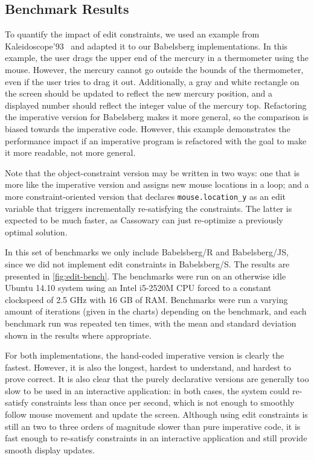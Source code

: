 \documentclass[numbers]{sigplanconf}
\begin{document}
\subsection*{Benchmark Results}
To quantify the impact of edit constraints, we used an example from
Kaleidoscope'93~\cite{lopez-oopsla-1994} and adapted it to our Babelsberg
implementations. In this example, the user drags the upper end of the mercury in
a thermometer using the mouse. However, the mercury cannot go outside the bounds
of the thermometer, even if the user tries to drag it out. Additionally, a gray
and white rectangle on the screen should be updated to reflect the new mercury
position, and a displayed number should reflect the integer value of the mercury
top. Refactoring the imperative version for Babelsberg makes it more general, so
the comparison is biased towards the imperative code. However, this example
demonstrates the performance impact if an imperative program is refactored with
the goal to make it more readable, not more general.

Note that the object-constraint version may be written in two ways: one that is
more like the imperative version and assigns new mouse locations in a loop; and
a more constraint-oriented version that declares \lstinline{mouse.location_y} as
an edit variable that triggers incrementally re-satisfying the constraints. The
latter is expected to be much faster, as Cassowary can just re-optimize a
previously optimal solution.

In this set of benchmarks we only include Babelsberg/R and Babelsberg/JS, since
we did not implement edit constraints in Babelsberg/S. The results are presented
in \autoref{fig:edit-bench}. The benchmarks were run on an otherwise idle Ubuntu
14.10 system using an Intel i5-2520M CPU forced to a constant clockspeed of 2.5
GHz with 16 GB of RAM. Benchmarks were run a varying amount of iterations (given
in the charts) depending on the benchmark, and each benchmark run was repeated
ten times, with the mean and standard deviation shown in the results where
appropriate.

For both implementations, the hand-coded imperative version is clearly the
fastest. However, it is also the longest, hardest to understand, and hardest to
prove correct. It is also clear that the purely declarative versions are
generally too slow to be used in an interactive application: in both cases, the
system could re-satisfy constraints less than once per second, which is not
enough to smoothly follow mouse movement and update the screen. Although using
edit constraints is still an two to three orders of magnitude slower than pure
imperative code, it is fast enough to re-satisfy constraints in an interactive
application and still provide smooth display updates.
\end{document}
